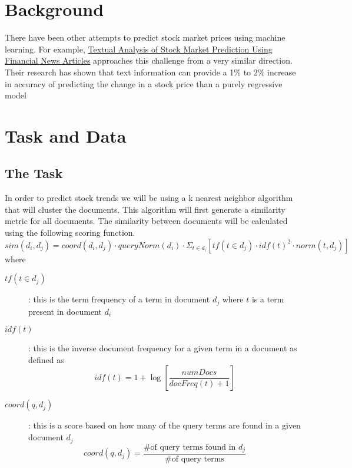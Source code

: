 \documentclass[11pt,letterpaper]{article}
\newcommand{\blue}[1]{\textcolor{RoyalBlue}{#1}}
\newcommand{\instructions}[1]{\blue{\textit{#1}}}
\begin{document}
\section{Background}
\label{sec:background}
There have been other attempts to predict stock market prices using machine
learning. For example, \href{http://ailab.arizona.edu/intranet/papers/Textual\%20Analysis\%20of\%20Stock\%20Market.pdf}{Textual Analysis of Stock Market Prediction Using Financial News Articles}
approaches this challenge from a very similar direction. Their research has
shown that text information can provide a 1\% to 2\% increase in accuracy of
predicting the change in a stock price than a purely regressive model ~\cite{arizona}

\section{Task and Data}
\label{sec:taskAndData}

\subsection{The Task}
\label{sec:task}
In order to predict stock trends we will be using a k nearest neighbor
algorithm that will cluster the documents. This algorithm will
first generate a similarity metric for all documents.
The similarity between documents will be calculated using the
following scoring function. ~\cite{similarity}
\begin{equation}\label{doc:sim}
	sim(d_i, d_j) = coord(d_i, d_j) \cdot queryNorm(d_i) \cdot \Sigma_{t \in d_i} \left[ tf(t \in d_j) \cdot idf(t)^2 \cdot norm(t,d_j) \right]
\end{equation}
where
\begin{description}
	\item[\(tf(t \in d_j)\)] : this is the term frequency of a term in document \(d_j\) where \(t\) is a term present in document \(d_i\)
	\item[\(idf(t)\)] : this is the inverse document frequency for a given term in a document as defined as
	\begin{equation}\label{doc:idf}
		idf(t) = 1 + \log \left[ \frac{numDocs}{docFreq(t) + 1} \right]
	\end{equation}
	\item[\(coord(q,d_j)\)] : this is a score based on how many of the query terms are found in a given document \(d_j\)
	\begin{equation}\label{doc:coord}
		coord(q,d_j) = \frac{\text{\# of query terms found in } d_j }{\text{\# of query terms}}
	\end{equation}
\end{description}
\end{document}
